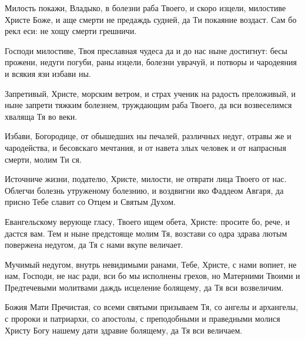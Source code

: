 \begin{mymulticols}

Милость покажи, Владыко, в болезни раба Твоего, и скоро изцели, милостиве Христе Боже, и аще смерти не предаждь судней, да Ти покаяние воздаст. Сам бо рекл еси: не хощу смерти грешничи.


Господи милостиве, Твоя преславная чудеса да и до нас ныне достигнут: бесы прожени, недуги погуби, раны изцели, болезни уврачуй, и потворы и чародеяния и всякия язи избави ны.

\slava

Запретивый, Христе, морским ветром, и страх ученик на радость преложивый, и ныне запрети тяжким болезнем, труждающим раба Твоего, да вси возвеселимся хваляща Тя во веки.

\inyne

Избави, Богородице, от обышедших ны печалей, различных недуг, отравы же и чародейства, и бесовскаго мечтания, и от навета злых человек и от напрасныя смерти, молим Ти ся.






Источниче жизни, подателю, Христе, милости, не отврати лица Твоего от нас. Облегчи болезнь утруженому болезнию, и воздвигни яко Фаддеом Авгаря, да присно Тебе славит со Отцем и Святым Духом.


Евангельскому верующе гласу, Твоего ищем обета, Христе: просите бо, рече, и дастся вам. Тем и ныне предстояще молим Тя, возстави со одра здрава лютым повержена недугом, да Тя с нами вкупе величает.

\slava

Мучимый недугом, внутрь невидимыми ранами, Тебе, Христе, с нами вопиет, не нам, Господи, не нас ради, вси бо мы исполнены грехов, но Матерними Твоими и Предтечевыми молитвами даждь исцеление болящему, да Тя вси возвеличим.

\inyne

Божия Мати Пречистая, со всеми святыми призываем Тя, со ангелы и архангелы, с пророки и патриархи, со апостолы, с преподобными и праведными молися Христу Богу нашему дати здравие болящему, да Тя вси величаем.



\end{mymulticols}
